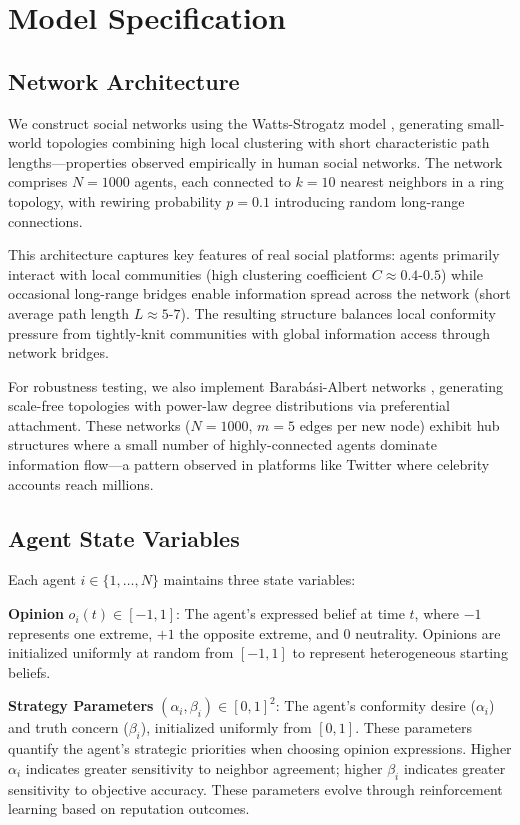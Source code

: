 \documentclass[11pt,a4paper]{article}
\begin{document}
\section{Model Specification}

\subsection{Network Architecture}

We construct social networks using the Watts-Strogatz model \cite{watts1998collective}, generating small-world topologies combining high local clustering with short characteristic path lengths—properties observed empirically in human social networks. The network comprises $N=1000$ agents, each connected to $k=10$ nearest neighbors in a ring topology, with rewiring probability $p=0.1$ introducing random long-range connections.

This architecture captures key features of real social platforms: agents primarily interact with local communities (high clustering coefficient $C \approx 0.4$-$0.5$) while occasional long-range bridges enable information spread across the network (short average path length $L \approx 5$-$7$). The resulting structure balances local conformity pressure from tightly-knit communities with global information access through network bridges.

For robustness testing, we also implement Barabási-Albert networks \cite{barabasi1999emergence}, generating scale-free topologies with power-law degree distributions via preferential attachment. These networks ($N=1000$, $m=5$ edges per new node) exhibit hub structures where a small number of highly-connected agents dominate information flow—a pattern observed in platforms like Twitter where celebrity accounts reach millions.

\subsection{Agent State Variables}

Each agent $i \in \{1, \ldots, N\}$ maintains three state variables:

\textbf{Opinion} $o_i(t) \in [-1, 1]$: The agent's expressed belief at time $t$, where $-1$ represents one extreme, $+1$ the opposite extreme, and $0$ neutrality. Opinions are initialized uniformly at random from $[-1, 1]$ to represent heterogeneous starting beliefs.

\textbf{Strategy Parameters} $(\alpha_i, \beta_i) \in [0, 1]^2$: The agent's conformity desire ($\alpha_i$) and truth concern ($\beta_i$), initialized uniformly from $[0, 1]$. These parameters quantify the agent's strategic priorities when choosing opinion expressions. Higher $\alpha_i$ indicates greater sensitivity to neighbor agreement; higher $\beta_i$ indicates greater sensitivity to objective accuracy. These parameters evolve through reinforcement learning based on reputation outcomes.
\end{document}
